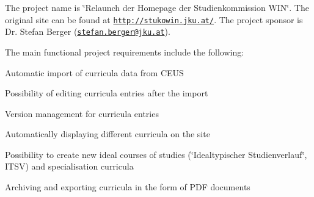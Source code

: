 The project name is \char`\"{}\+Relaunch der Homepage der Studienkommission W\+I\+N\char`\"{}. The original site can be found at \href{http://stukowin.jku.at/}{\tt http\+://stukowin.\+jku.\+at/}. The project sponsor is Dr. Stefan Berger (\href{mailto:stefan.berger@jku.at}{\tt stefan.\+berger@jku.\+at}).

The main functional project requirements include the following\+:
\begin{DoxyEnumerate}
\item Automatic import of curricula data from C\+E\+U\+S
\item Possibility of editing curricula entries after the import
\item Version management for curricula entries
\item Automatically displaying different curricula on the site
\item Possibility to create new ideal courses of studies (\char`\"{}\+Idealtypischer Studienverlauf\char`\"{}, I\+T\+S\+V) and specialisation curricula
\item Archiving and exporting curricula in the form of P\+D\+F documents
\end{DoxyEnumerate}


